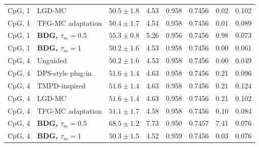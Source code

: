 \documentclass{article}
\begin{document}
\begin{table}[!htbp]
\begin{tabular}{llcccccc}
CpG, 1 & LGD-MC & $50.5\pm1.8$ & 4.53 & 0.958 & 0.7456 & 0.02 & 0.102\\
CpG, 1 & TFG-MC adaptation & $50.4\pm1.7$ & 4.54 & 0.958 & 0.7456 & 0.01 & 0.089\\
CpG, 1 & \textbf{BDG, $\tau_m=0.5$} & $55.3\pm0.8$ & 5.26 & 0.956 & 0.7456 & 0.98 & 0.073\\
CpG, 1 & \textbf{BDG, $\tau_m=1$} & $50.2\pm1.6$ & 4.53 & 0.958 & 0.7456 & 0.00 & 0.061\\
\midrule
CpG, 4 & Unguided & $50.2\pm1.6$ & 4.53 & 0.958 & 0.7456 & 0.00 & 0.049\\
CpG, 4 & DPS-style plug-in & $51.6\pm1.4$ & 4.63 & 0.958 & 0.7456 & 0.21 & 0.096\\
CpG, 4 & TMPD-inspired & $51.6\pm1.4$ & 4.63 & 0.958 & 0.7456 & 0.21 & 0.124\\
CpG, 4 & LGD-MC & $51.6\pm1.4$ & 4.63 & 0.958 & 0.7456 & 0.21 & 0.102\\
CpG, 4 & TFG-MC adaptation & $51.1\pm1.7$ & 4.58 & 0.958 & 0.7456 & 0.10 & 0.084\\
CpG, 4 & \textbf{BDG, $\tau_m=0.5$} & $68.5\pm1.2$ & 7.73 & 0.950 & 0.7457 & 7.41 & 0.076\\
CpG, 4 & \textbf{BDG, $\tau_m=1$} & $50.3\pm1.5$ & 4.52 & 0.959 & 0.7456 & 0.03 & 0.076\\
\bottomrule
\end{tabular}
\end{table}
\clearpage
\end{document}
